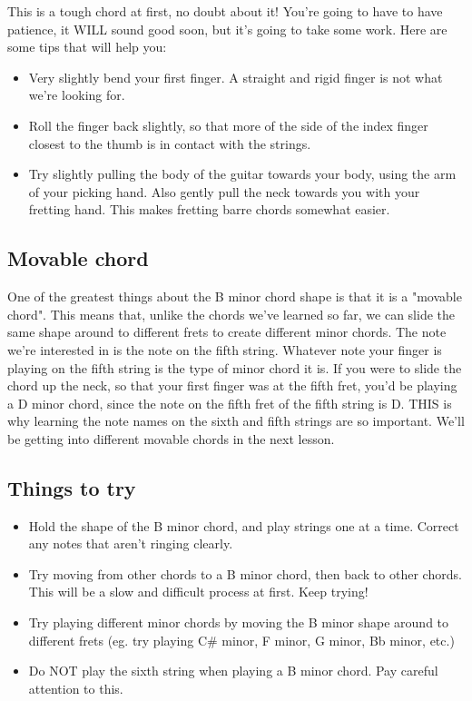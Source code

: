 This is a tough chord at first, no doubt about it! You're going to have to have patience, it WILL sound good soon, but it's going to take some work. Here are some tips that will help you:
\begin{itemize}
\item Very slightly bend your first finger. A straight and rigid finger is not what we're looking for.
\item Roll the finger back slightly, so that more of the side of the index finger closest to the thumb is in contact with the strings.
\item Try slightly pulling the body of the guitar towards your body, using the arm of your picking hand. Also gently pull the neck towards you with your fretting hand. This makes fretting barre chords somewhat easier. 
\end{itemize}

\subsection{Movable chord}
One of the greatest things about the B minor chord shape is that it is a "movable chord". This means that, unlike the chords we've learned so far, we can slide the same shape around to different frets to create different minor chords. The note we're interested in is the note on the fifth string. Whatever note your finger is playing on the fifth string is the type of minor chord it is. If you were to slide the chord up the neck, so that your first finger was at the fifth fret, you'd be playing a D minor chord, since the note on the fifth fret of the fifth string is D. THIS is why learning the note names on the sixth and fifth strings are so important. We'll be getting into different movable chords in the next lesson. 

\subsection{Things to try}
\begin{itemize}
\item Hold the shape of the B minor chord, and play strings one at a time. Correct any notes that aren't ringing clearly.
\item Try moving from other chords to a B minor chord, then back to other chords. This will be a slow and difficult process at first. Keep trying!
\item Try playing different minor chords by moving the B minor shape around to different frets (eg. try playing C\# minor, F minor, G minor, Bb minor, etc.)
\item Do NOT play the sixth string when playing a B minor chord. Pay careful attention to this. 
\end{itemize}

